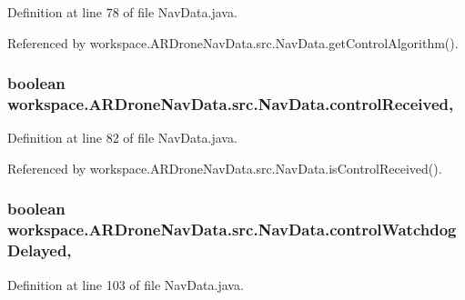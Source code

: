 Definition at line 78 of file Nav\+Data.\+java.



Referenced by workspace.\+A\+R\+Drone\+Nav\+Data.\+src.\+Nav\+Data.\+get\+Control\+Algorithm().

\hypertarget{classworkspace_1_1_a_r_drone_nav_data_1_1src_1_1_nav_data_afa4db24683e5caa8a469af2f49e78565}{}
\subsubsection[{control\+Received}]{\setlength{\rightskip}{0pt plus 5cm}boolean workspace.\+A\+R\+Drone\+Nav\+Data.\+src.\+Nav\+Data.\+control\+Received\hspace{0.3cm}{\ttfamily [static]}, {\ttfamily [protected]}}\label{classworkspace_1_1_a_r_drone_nav_data_1_1src_1_1_nav_data_afa4db24683e5caa8a469af2f49e78565}


Definition at line 82 of file Nav\+Data.\+java.



Referenced by workspace.\+A\+R\+Drone\+Nav\+Data.\+src.\+Nav\+Data.\+is\+Control\+Received().

\hypertarget{classworkspace_1_1_a_r_drone_nav_data_1_1src_1_1_nav_data_a5426474d7767032c73a078de09b51312}{}
\subsubsection[{control\+Watchdog\+Delayed}]{\setlength{\rightskip}{0pt plus 5cm}boolean workspace.\+A\+R\+Drone\+Nav\+Data.\+src.\+Nav\+Data.\+control\+Watchdog\+Delayed\hspace{0.3cm}{\ttfamily [static]}, {\ttfamily [protected]}}\label{classworkspace_1_1_a_r_drone_nav_data_1_1src_1_1_nav_data_a5426474d7767032c73a078de09b51312}


Definition at line 103 of file Nav\+Data.\+java.



